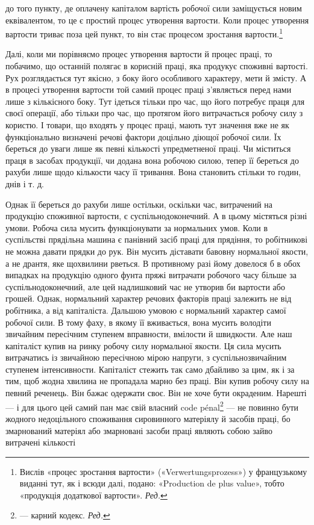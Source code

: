 \parcont{}  %
до того пункту, де оплачену капіталом вартість робочої сили заміщується
новим еквівалентом, то це є простий процес утворення
вартости. Коли процес утворення вартости триває поза цей пункт,
то він стає процесом зростання вартости.\footnote*{
Вислів «процес зростання вартости» («Verwertungsprozess») у французькому
виданні тут, як і всюди далі, подано: «Production de plus
value», тобто «продукція додаткової вартости». \emph{Ред.}
}

Далі, коли ми порівняємо процес утворення вартости й процес
праці, то побачимо, що останній полягає в корисній праці, яка
продукує споживні вартості. Рух розглядається тут якісно,
з боку його особливого характеру, мети й змісту. А в процесі
утворення вартости той самий процес праці з’являється перед
нами лише з кількісного боку. Тут ідеться тільки про час, що
його потребує праця для своєї операції, або тільки про час, що
протягом його витрачається робочу силу з користю. І товари,
що входять у процес праці, мають тут значення вже не як функціонально
визначені речові фактори доцільно діющої робочої
сили. Їх береться до уваги лише як певні кількості упредметненої
праці. Чи міститься праця в засобах продукції, чи додана
вона робочою силою, тепер її береться до рахуби лише щодо
кількости часу її тривання. Вона становить стільки то годин,
днів і т. д.

Однак її береться до рахуби лише остільки, оскільки час,
витрачений на продукцію споживної вартости, є суспільнодоконечний.
А в цьому містяться різні умови. Робоча сила мусить
функціонувати за нормальних умов. Коли в суспільстві прядільна
машина є панівний засіб праці для прядіння, то робітникові
не можна давати прядки до рук. Він мусить діставати бавовну
нормальної якости, а не дрантя, яке щохвилини рветься. В противному
разі йому довелося б в обох випадках на продукцію одного
фунта пряжі витрачати робочого часу більше за суспільнодоконечний,
але цей надлишковий час не утворив би вартости
або грошей. Однак, нормальний характер речових факторів праці
залежить не від робітника, а від капіталіста. Дальшою умовою
є нормальний характер самої робочої сили. В тому фаху, в якому
її вживається, вона мусить володіти звичайним пересічним ступенем
вправности, вмілости й швидкости. Але наш капіталіст
купив на ринку робочу силу нормальної якости. Ця сила мусить
витрачатись із звичайною пересічною мірою напруги, з суспільнозвичайним
ступенем інтенсивности. Капіталіст стежить так само
дбайливо за цим, як і за тим, щоб жодна хвилина не пропадала
марно без праці. Він купив робочу силу на певний реченець.
Він бажає одержати своє. Він не хоче бути окраденим. Нарешті —
і для цього цей самий пан має свій власний code pénal\footnote*{
— карний кодекс. \emph{Ред.}
} — не
повинно бути жодного недоцільного споживання сировинного
матеріялу й засобів праці, бо змарнований матеріял або змарновані
засоби праці являють собою зайво витрачені кількості
\parbreak{}  %
